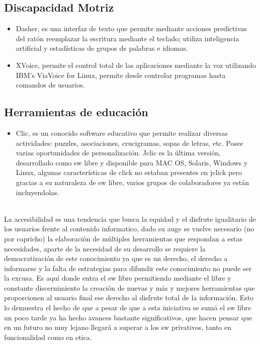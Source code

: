 \begin{multicols}{2}
\subsection*{Discapacidad Motriz}
\begin{itemize}
\item Dasher, es una interfaz de texto que permite mediante acciones predictivas del ratón reemplazar la escritura mediante el teclado; utiliza inteligencia artificial y estadísticas de grupos de palabras e idiomas.
\item XVoice, permite el control total de las aplicaciones mediante la voz utilizando IBM's ViaVoice for Linux, permite desde controlar programas hasta comandos de usuarios.
\end{itemize}



\subsection*{Herramientas de educación}
\begin{itemize}
\item Clic, es un conocido software educativo que permite realizar diversas actividades: puzzles, asociaciones, crucigramas, sopas de letras, etc. Posee varias oportunidades de personalización. Jclic es la última versión, desarrollado como sw libre y disponible para MAC OS, Solaris, Windows y Linux, algunas características de click no estaban presentes en jclick pero gracias a su naturaleza de sw libre, varios grupos de colaboradores ya están incluyendolas.
\end{itemize}

\\
La accesibilidad es una tendencia que busca la equidad y el disfrute igualitario de los usuarios frente al contenido informatico, dado su auge se vuelve necesario (no por capricho) la elaboración de múltiples herramientas que respondan a estas necesidades, aparte de la necesidad de su desarrollo se requiere la democratización de este conocimiento ya que es un derecho, el derecho a informarse y la falta de estrategias para difundir este conocimiento no puede ser la excusa. Es aquí donde entra el sw libre permitiendo mediante el libre y constante discernimiento la creación de nuevas y más y mejores herramientas que proporcionen al usuario final ese derecho al disfrute total de la información. Esto lo demuestra el hecho de que a pesar de que a esta iniciativa se sumó el sw libre un poco tarde ya ha hecho avances bastante significativos, que hacen pensar que en un futuro no muy lejano llegará a superar a los sw privativos, tanto en funcionalidad como en etica.


\end{multicols}
